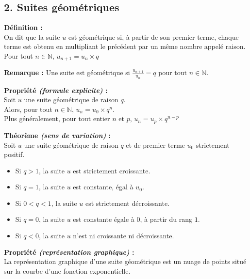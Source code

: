 \documentclass[11pt,a4paper]{article}
\begin{document}
\newpage

\subsection*{2. Suites géométriques}

\begin{mdframed}[style=definitionStyle]
  \textbf{Définition :} ~\\
  On dit que la suite $u$ est géométrique si, à partir de son premier terme, chaque terme est obtenu en multipliant le
  précédent par un même nombre appelé raison. \\
  Pour tout $n\in\mathbb{N}$, $u_{n+1}=u_n\times q$
\end{mdframed}

\textbf{Remarque :} Une suite est géométrique si $\frac{u_{n+1}}{u_n}=q$ pour tout $n\in\mathbb{N}$.

\begin{mdframed}[style=proprieteStyle]
    \textbf{Propriété \emph{(formule explicite)} :} ~\\
    Soit $u$ une suite géométrique de raison $q$. \\
    Alors, pour tout $n\in\mathbb{N}$, $u_n=u_0\times q^n$. \\
    Plus généralement, pour tout entier $n$ et $p$, $u_n=u_p\times q^{n-p}$
\end{mdframed}

\begin{mdframed}[style=proprieteStyle]
    \textbf{Théorème \emph{(sens de variation)} :} ~\\
    Soit $u$ une suite géométrique de raison $q$ et de premier terme $u_0$ strictement positif.
    \begin{itemize}
      \item Si $q>1$, la suite $u$ est strictement croissante.
      \item Si $q=1$, la suite $u$ est constante, égal à $u_0$.
      \item Si $0<q<1$, la suite $u$ est strictement décroissante.
      \item Si $q=0$, la suite $u$ est constante égale à $0$, à partir du rang $1$.
      \item Si $q<0$, la suite $u$ n'est ni croissante ni décroissante.
    \end{itemize}
\end{mdframed}

\begin{mdframed}[style=proprieteStyle]
    \textbf{Propriété \emph{(représentation graphique)} :} ~\\
    La représentation graphique d'une suite géométrique est un nuage de points situé sur la courbe d'une fonction exponentielle.
\end{mdframed}
\end{document}
